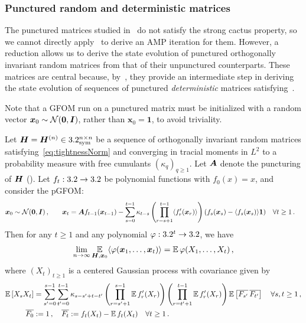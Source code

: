 \subsubsection{Punctured random and deterministic matrices}
\label{sec:dynamics-reg}

The punctured matrices studied in~ do not satisfy the strong cactus property, so we cannot directly apply~ to derive an AMP iteration for them. However, a reduction allows us to derive the state evolution of punctured orthogonally invariant random matrices from that of their unpunctured counterparts. These matrices are central because, by~, they provide an intermediate step in deriving the state evolution of sequences of punctured {\em deterministic} matrices satisfying~.

Note that a GFOM run on a punctured matrix must be initialized with a random vector ${\bm x}_0 \sim {\cal N}(\bm{0}, {\bm I})$, rather than $\bm{x}_0 = \bm{1}$, to avoid triviality.

\begin{theorem}\label{prop:hadamard-explicit-state}
    Let ${\bm H} = {\bm H}^{(n)} \in 3.2_{\mathrm{sym}}^{n \times n}$ be a sequence of orthogonally invariant random matrices satisfying~\cref{eq:tightnessNorm} and converging in tracial moments in $L^2$ to a probability measure with free cumulants $(\kappa_q)_{q\ge 1}$. 
    Let ${\bm A}$ denote the puncturing of ${\bm H}$ ().
    Let $f_t : 3.2 \to 3.2$ be polynomial functions with $f_0(x)=x$, and consider the pGFOM:
    \begin{alignat*}{2}
        \bm x_0 &\sim {\cal N}(\bm 0, \bm I)\,,\quad &\bm x_t &= \bm A { f_{t-1}(\bm x_{t-1})} - \sum_{s=0}^{t-1} \kappa_{t-s} \left(\prod_{r=s+1}^{t-1} \langle f_r'(\bm x_r)\rangle\right) (f_s(\bm x_s) - \langle f_s(\bm x_s)\rangle \bm{1})\quad \forall t\ge 1\,.\label{eq:ampPunctured}
    \end{alignat*}
    Then for any $t\ge 1$ and any polynomial $\varphi:3.2^t \to 3.2$, we have
    \[
        \lim_{n\to\infty}  \operatorname*{\mathbb{E}}_{\bm H,\bm x_0} \langle \varphi(\bm x_1, \ldots, \bm x_t)\rangle = \operatorname*{\mathbb{E}} \varphi(X_1, \ldots, X_t)\,,
    \]
    where $(X_t)_{t\ge 1}$ is a centered Gaussian process with covariance given by
    \begin{align*}
        \operatorname*{\mathbb{E}}\left[X_s X_t\right] &= \sum_{s' = 0}^{s-1}\sum_{t'=0}^{t-1} \kappa_{s-s'+t-t'} \left(\prod_{r= s'+1}^{s-1} \operatorname*{\mathbb{E}} f'_r(X_r) \right) \left(\prod_{r=t'+1}^{t-1} \operatorname*{\mathbb{E}} f'_r(X_r)\right) \operatorname*{\mathbb{E}} \left[\overline{F_{s'}} \, \overline{F_{t'}}\right]\quad \forall s,t\ge 1\,,\\
        \overline{F_0} &:= 1\,,\quad \overline{F_t} := f_t(X_t) - \operatorname*{\mathbb{E}} f_t(X_t)\quad \forall t\ge 1\,.
    \end{align*}
\end{theorem}

